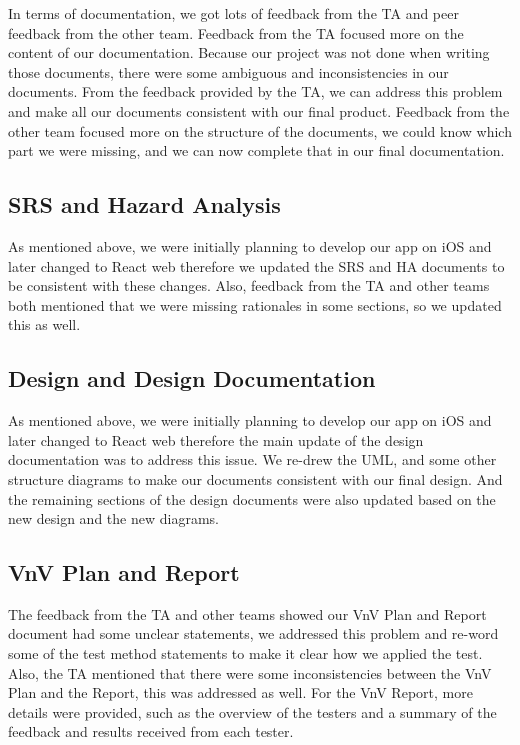 \documentclass{article}
\begin{document}
In terms of documentation, we got lots of feedback from the TA and peer feedback from the other team. Feedback from the TA focused more on the content of our documentation. Because our project was not done when writing those documents, there were some ambiguous and inconsistencies in our documents. From the feedback provided by the TA, we can address this problem and make all our documents consistent with our final product. Feedback from the other team focused more on the structure of the documents, we could know which part we were missing, and we can now complete that in our final documentation.

\subsection{SRS and Hazard Analysis}
As mentioned above, we were initially planning to develop our app on iOS and later changed to React web therefore we updated the SRS and HA documents to be consistent with these changes. Also, feedback from the TA and other teams both mentioned that we were missing rationales in some sections, so we updated this as well.


\subsection{Design and Design Documentation}
As mentioned above, we were initially planning to develop our app on iOS and later changed to React web therefore the main update of the design documentation was to address this issue. We re-drew the UML, and some other structure diagrams to make our documents consistent with our final design. And the remaining sections of the design documents were also updated based on the new design and the new diagrams.

\subsection{VnV Plan and Report}
The feedback from the TA and other teams showed our VnV Plan and Report document had some unclear statements, we addressed this problem and re-word some of the test method statements to make it clear how we applied the test. Also, the TA mentioned that there were some inconsistencies between the VnV Plan and the Report, this was addressed as well. For the VnV Report, more details were provided, such as the overview of the testers and a summary of the feedback and results received from each tester.
\end{document}
